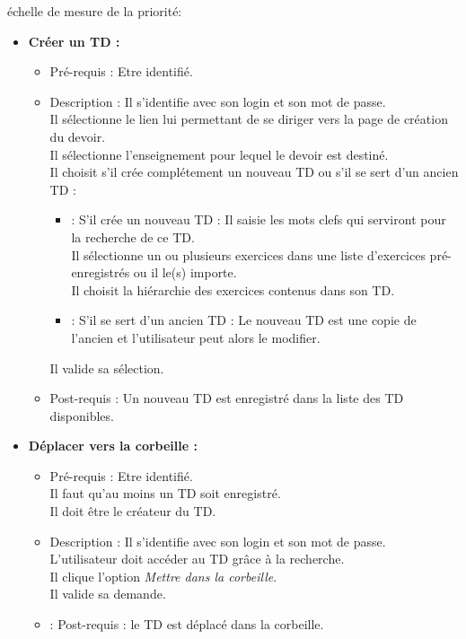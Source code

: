 \begin{center}
{\'e}chelle de mesure de la priorit{\'e}:

\end{center}

\begin{itemize}
\item {\bf Cr{\'e}er un TD :}
	\begin{itemize}
	\item Pr{\'e}-requis : Etre identifi{\'e}.
	\item Description : Il s'identifie avec son login et son mot de passe.\\
	Il s{\'e}lectionne le lien lui permettant de se diriger vers la page de cr{\'e}ation du devoir.\\
	Il s{\'e}lectionne l'enseignement pour lequel le devoir est destin{\'e}.\\
	Il choisit s'il cr{\'e}e compl{\'e}tement un nouveau TD ou s'il se sert d'un ancien TD :
	\begin{itemize}
		\item : S'il cr{\'e}e un nouveau TD : Il saisie les mots clefs qui serviront pour la recherche de ce TD.\\
		Il s{\'e}lectionne un ou plusieurs exercices dans une liste d'exercices pr{\'e}-enregistr{\'e}s ou il le(s) importe.\\
		Il choisit la hi{\'e}rarchie des exercices contenus dans son TD.
		\item : S'il se sert d'un ancien TD : Le nouveau TD est une copie de l'ancien et l'utilisateur peut alors le modifier.
	\end{itemize}
	Il valide sa s{\'e}lection.
	\item Post-requis : Un nouveau TD est enregistr{\'e} dans la liste des TD disponibles.\\
	\end{itemize}

\item {\bf D{\'e}placer vers la corbeille :}
	\begin{itemize}
	\item Pr{\'e}-requis : Etre identifi{\'e}.\\
	Il faut qu'au moins un TD soit enregistr{\'e}.\\
	Il doit {\^e}tre le cr{\'e}ateur du TD.
	\item Description : Il s'identifie avec son login et son mot de passe.\\
	L'utilisateur doit acc{\'e}der au TD gr{\^a}ce {\`a} la recherche.\\
	Il clique l'option {\it Mettre dans la corbeille}.\\
	Il valide sa demande.
	\item : Post-requis : le TD est d{\'e}plac{\'e} dans la corbeille.\\
	\end{itemize}

\end{itemize}

